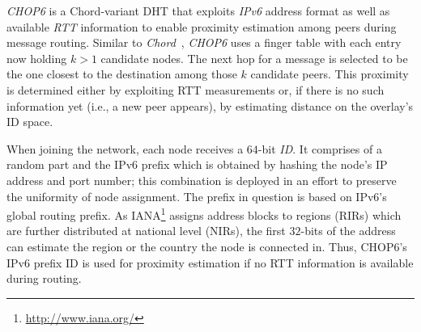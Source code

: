 \emph{CHOP6} \cite{MT2007} is a Chord-variant DHT that exploits
{\sl IPv6} address format as well as available \emph{RTT} information to 
enable proximity estimation among peers during message routing.
Similar to \emph{Chord}~\cite{stoica_chord_2001}, 
\emph{CHOP6} uses a finger table with each entry now holding $k$$>$$1$ candidate
nodes. 
The next hop for a message is selected to be the one closest to the
destination among those $k$ candidate peers. 
This proximity is determined either
by exploiting RTT measurements or, if there is no such information yet 
(i.e., a new peer appears), by
estimating distance on the overlay's ID space. 

When joining the network, each node
receives a $64$-bit \emph{ID}. 
It comprises of a random part and the IPv6 prefix which 
is obtained by hashing the node's IP address and port
number; this combination is deployed in an effort  
to preserve the uniformity of node assignment. 
The prefix in question is based on IPv6's global routing prefix.
As IANA\footnote{\url{http://www.iana.org/}}  
assigns address blocks to regions (RIRs) which are further
distributed at national level (NIRs), the first $32$-bits of the address
can estimate the region or the country the node is connected in. 
Thus, CHOP6's IPv6 prefix ID is used for proximity estimation
if no RTT information is available during routing. 
%

